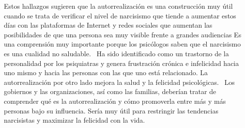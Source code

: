 \documentclass[jou,apacite]{apa6}
\begin{document}
Estos hallazgos sugieren que la autorrealización es una construcción muy útil cuando se trata de verificar el nivel de narcisismo que tiende a aumentar estos días con las plataformas de Internet y redes sociales que aumentan las posibilidades de que una persona sea muy visible frente a grandes audiencias Es una comprensión muy importante porque los psicólogos saben que el narcisismo es una cualidad no saludable.~\cite{Schmidt} Ha sido identificado como un trastorno de la personalidad por los psiquiatras y genera frustración crónica e infelicidad hacia uno mismo y hacia las personas con las que uno está relacionado. La autorrealización por otro lado mejora la salud y la felicidad psicológicas.~\cite{Raskin} Los gobiernos y las organizaciones, así como las familias, deberían tratar de comprender qué es la autorrealización y cómo promoverla entre más y más personas bajo su influencia. Sería muy útil para restringir las tendencias narcisistas y maximizar la felicidad con la vida.





\end{document}
